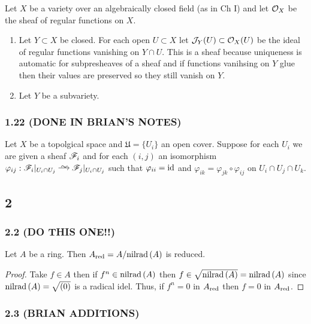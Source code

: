 \documentclass[12pt]{article}
\begin{document}
Let $X$ be a variety over an algebraically closed field (as in Ch I) and let $\mathcal{O}_{X}$ be the sheaf of regular functions on $X$.

\begin{enumerate}
\item Let $Y \subset X$ be closed. For each open $U \subset X$ let $\mathcal{J}_Y(U) \subset \mathcal{O}_{X}(U)$ be the ideal of regular functions vanishing on $Y \cap U$. This is a sheaf because uniqueness is automatic for subpresheaves of a sheaf and if functions vanihsing on $Y$ glue then their values are preserved so they still vanish on $Y$.

\item Let $Y$ be a subvariety. 
\end{enumerate}

\subsubsection{1.22 (DONE IN BRIAN'S NOTES)}

\renewcommand{\U}{\mathfrak{U}}

Let $X$ be a topolgical space and $\U = \{ U_i \}$ an open cover. Suppose for each $U_i$ we are given a sheaf $\mathscr{F}_i$ and for each $(i,j)$ an isomorphism $\varphi_{ij} : \F_i |_{U_i \cap U_j} \iso \F_j|_{U_i \cap U_j}$ such that $\varphi_{ii} = \mathrm{id}$ and $\varphi_{ik} = \varphi_{jk} \circ \varphi_{ij}$ on $U_i \cap U_j \cap U_k$. 



\subsection{2}

\subsubsection{2.2 (DO THIS ONE!!)}

\begin{proposition}
Let $A$ be a ring. Then $A_{\mathrm{red}} = A / \mathrm{nilrad}\left( A \right)$ is reduced.
\end{proposition}

\begin{proof}
Take $f \in A$ then if $f^n \in \mathrm{nilrad}\left( A \right)$ then $f \in \sqrt{\mathrm{nilrad}\left( A \right)} = \mathrm{nilrad}\left( A \right)$ since $\mathrm{nilrad}\left( A \right) = \sqrt{(0)}$ is a radical idel. Thus, if $f^n = 0$ in $A_{\mathrm{red}}$ then $f = 0$ in $A_{\mathrm{red}}$. 
\end{proof}

\subsubsection{2.3 (BRIAN ADDITIONS)}
\end{document}
